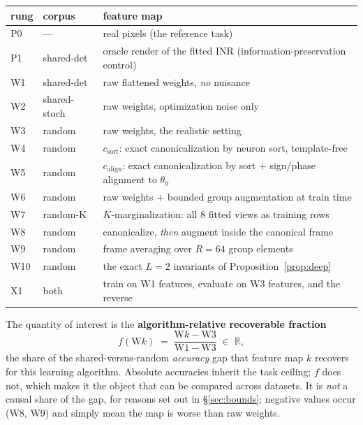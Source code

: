 \documentclass[10pt,letterpaper]{article}
\theoremstyle{definition}
\newcommand{\R}{\mathbb{R}}
\newcommand{\csort}{c_{\mathrm{sort}}}
\newcommand{\calign}{c_{\mathrm{align}}}
\begin{document}
\begin{center}\small
\begin{tabular}{@{}llp{7.6cm}@{}}
\toprule
rung & corpus & feature map \\
\midrule
P0 & --- & real pixels (the reference task) \\
P1 & shared-det & oracle render of the fitted INR (information-preservation control) \\
W1 & shared-det & raw flattened weights, \emph{no} nuisance \\
W2 & shared-stoch & raw weights, optimization noise only \\
W3 & random & raw weights, the realistic setting \\
W4 & random & $\csort$: exact canonicalization by neuron sort, template-free \\
W5 & random & $\calign$: exact canonicalization by sort $+$ sign/phase alignment to $\theta_0$ \\
W6 & random & raw weights $+$ bounded group augmentation at train time \\
W7 & random-K & $K$-marginalization: all 8 fitted views as training rows \\
W8 & random & canonicalize, \emph{then} augment inside the canonical frame \\
W9 & random & frame averaging over $R=64$ group elements \\
W10 & random & the exact $L{=}2$ invariants of Proposition~\ref{prop:deep} \\
X1 & both & train on W1 features, evaluate on W3 features, and the reverse \\
\bottomrule
\end{tabular}
\end{center}

The quantity of interest is the \textbf{algorithm-relative recoverable fraction}
\begin{equation}
f(\mathrm{W}k) \;=\; \frac{\mathrm{W}k - \mathrm{W3}}{\mathrm{W1} - \mathrm{W3}} \;\in\; \R,
\label{eq:f}
\end{equation}
the share of the shared-versus-random \emph{accuracy} gap that feature map $k$ recovers for this
learning algorithm. Absolute accuracies inherit the task ceiling; $f$ does not, which makes it the
object that can be compared across datasets. It is \emph{not} a causal share of the gap, for
reasons set out in \S\ref{sec:bounds}; negative values occur (W8, W9) and simply mean the map is
worse than raw weights.
\end{document}
